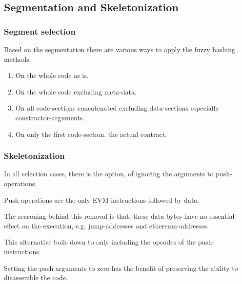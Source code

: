 \documentclass[../main.tex]{subfiles}
\begin{document}
\subsection{Segmentation and Skeletonization \cite{ethutils}}
\subsubsection{Segment selection}
Based on the segmentation there are various ways to apply the fuzzy hashing methods.

\begin{enumerate}
\item On the whole code as is.
\item On the whole code excluding meta-data.
\item On all code-sections concatenated excluding data-sections especially constructor-arguments.
\item On only the first code-section, the actual contract.
\end{enumerate}

\subsubsection{Skeletonization}
In all selection cases, there is the option, of ignoring the arguments to push-operations.

\begin{ul}
  \item Push-operations are the only EVM-instructions followed by data.
  \item The reasoning behind this removal is that, these data bytes have no essential effect on the execution, e.g. jump-addresses and ethereum-addresses.
  \item This alternative boils down to only including the opcodes of the push-instructions.
  \item Setting the push arguments to zero has the benefit of preserving the ability to disassemble the code.
\end{ul}
\end{document}
